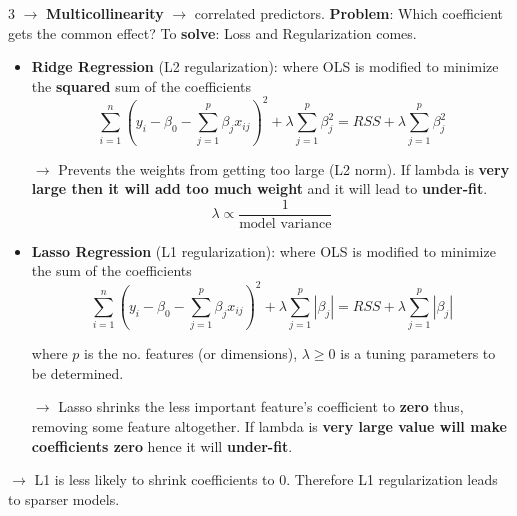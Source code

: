 \documentclass[letterpaper, 10.5pt,landscape]{article}
\begin{document}
\begin{multicols*}{3}
$\rightarrow$ \textbf{Multicollinearity} $\rightarrow$ correlated predictors. \textbf{Problem}: Which coefficient gets the common effect? To \textbf{solve}: Loss and Regularization comes. \\


\begin{itemize}[leftmargin=0.4cm]
     \item \textbf{Ridge Regression} (L2 regularization): where OLS is modified to minimize the \textbf{squared} sum of the coefficients 
     \vspace{-3pt}
    \[ \boxed{\sum^{n}_{i=1} (y_{i} - \beta_{0} - \sum^{p}_{j=1} \beta_{j} x_{ij})^{2} + \lambda \sum^{p}_{j=1} \beta^{2}_{j} = RSS + \lambda \sum^{p}_{j=1} \beta^{2}_{j}} \]
    \vspace{-7pt}
    
   $\rightarrow$ Prevents the weights from getting too large (L2 norm). If lambda is \textbf{very large then it will add too much weight} and it will lead to \textbf{under-fit}.
   \vspace{-2pt}
   \[ \boxed{ \lambda \propto \frac{1} {\text{model variance}}}  \]
    
    \item \textbf{Lasso Regression} (L1 regularization): where OLS is modified to minimize the sum of the coefficients 
    \vspace{-3pt}
    \[ \boxed{\sum^{n}_{i=1} (y_{i} - \beta_{0} - \sum^{p}_{j=1} \beta_{j} x_{ij})^{2} + \lambda \sum^{p}_{j=1} \left| \beta_{j} \right| = RSS + \lambda \sum^{p}_{j=1} \left| \beta_{j} \right|}  \]
    \vspace{-6pt}
     
    where $p$ is the no. features (or dimensions), $\lambda \geq 0$ is a tuning parameters to be determined. 
    
    \vspace{2pt}
    
   $\rightarrow$ Lasso shrinks the less important feature’s coefficient to \textbf{zero} thus, removing some feature altogether. If lambda is \textbf{very large value will make coefficients zero} hence it will \textbf{under-fit}.
   \vspace{-3pt}
\end{itemize}

$\rightarrow$ L1 is less likely to shrink coefficients to 0. Therefore L1 regularization leads to sparser models. \\




\end{multicols*}
\end{document}
